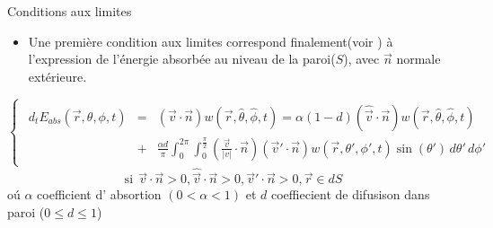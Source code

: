 \begin{frame}{Conditions aux limites} 
\begin{itemize}
\item Une première condition aux limites correspond finalement(voir \cite{Foy} ) à  l'expression de l'énergie absorbée au niveau de la paroi($S$), avec $\vec{n}$ normale extérieure. 
\end{itemize}
\begin{equation*}
\begin{cases}
\begin{split}
d_t E_{abs}(\vec{r},\theta,\phi,t)&=& (\vec{v}\cdot \vec{n}) w (\vec{r},\hat{\theta},\hat{\phi},t) 
= \alpha(1-d) (\hat{\vec{v}} \cdot \vec{n}) w (\vec{r},\hat{\theta},\hat{\phi},t)  \\
&+& \frac{\alpha d}{\pi} \int_{0}^{2\pi}\int_{0}^{\frac{\pi}{2}} (\frac{ \vec{v}}{\left | v \right |} \cdot \vec{n}) (\vec{v}' \cdot \vec{n})  w(\vec{r},\theta',\phi',t) \sin(\theta') \, d\theta' \,d\phi'    
\end{split}
\end{cases}
\end{equation*}
\begin{equation}
\mbox{si}  \ \   \vec{v} \cdot \vec{n} >0, \hat{\vec{v}} \cdot \vec{n} >0, \vec{v}' \cdot \vec{n} >0, \vec{r}\in dS 
\end{equation}
oú
$\alpha$ coefficient d' absortion  $(0<\alpha<1)$ et 
$d$ coeffiecient de difusison dans paroi ($ 0\leq d \leq 1$)
 
\end{frame}
%
